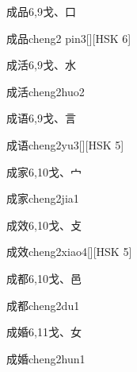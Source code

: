 \begin{entry}{成品}{6,9}{⼽、⼝}
  \begin{phonetics}{成品}{cheng2 pin3}[][HSK 6]
  \end{phonetics}
\end{entry}

\begin{entry}{成活}{6,9}{⼽、⽔}
  \begin{phonetics}{成活}{cheng2huo2}
  \end{phonetics}
\end{entry}

\begin{entry}{成语}{6,9}{⼽、⾔}
  \begin{phonetics}{成语}{cheng2yu3}[][HSK 5]
  \end{phonetics}
\end{entry}

\begin{entry}{成家}{6,10}{⼽、⼧}
  \begin{phonetics}{成家}{cheng2jia1}
  \end{phonetics}
\end{entry}

\begin{entry}{成效}{6,10}{⼽、⽁}
  \begin{phonetics}{成效}{cheng2xiao4}[][HSK 5]
  \end{phonetics}
\end{entry}

\begin{entry}{成都}{6,10}{⼽、⾢}
  \begin{phonetics}{成都}{cheng2du1}
  \end{phonetics}
\end{entry}

\begin{entry}{成婚}{6,11}{⼽、⼥}
  \begin{phonetics}{成婚}{cheng2hun1}
  \end{phonetics}
\end{entry}

